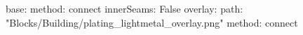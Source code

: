 base:
  method: connect
  innerSeams: False
overlay:
  path: "Blocks/Building/plating_lightmetal_overlay.png"
  method: connect